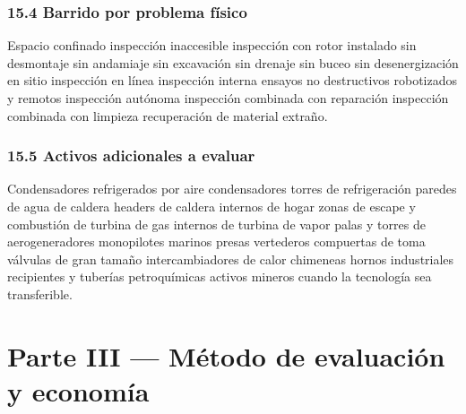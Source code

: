 \documentclass[11pt,a4paper]{article}
\begin{document}
\subsubsection*{15.4 Barrido por problema físico}

Espacio confinado \textperiodcentered{} inspección inaccesible \textperiodcentered{} inspección con rotor instalado \textperiodcentered{} sin desmontaje \textperiodcentered{} sin andamiaje \textperiodcentered{} sin excavación \textperiodcentered{} sin drenaje \textperiodcentered{} sin buceo \textperiodcentered{} sin desenergización \textperiodcentered{} en sitio \textperiodcentered{} inspección en línea \textperiodcentered{} inspección interna \textperiodcentered{} ensayos no destructivos robotizados y remotos \textperiodcentered{} inspección autónoma \textperiodcentered{} inspección combinada con reparación \textperiodcentered{} inspección combinada con limpieza \textperiodcentered{} recuperación de material extraño.


\subsubsection*{15.5 Activos adicionales a evaluar}

Condensadores refrigerados por aire \textperiodcentered{} condensadores \textperiodcentered{} torres de refrigeración \textperiodcentered{} paredes de agua de caldera \textperiodcentered{} headers de caldera \textperiodcentered{} internos de hogar \textperiodcentered{} zonas de escape y combustión de turbina de gas \textperiodcentered{} internos de turbina de vapor \textperiodcentered{} palas y torres de aerogeneradores \textperiodcentered{} monopilotes marinos \textperiodcentered{} presas \textperiodcentered{} vertederos \textperiodcentered{} compuertas de toma \textperiodcentered{} válvulas de gran tamaño \textperiodcentered{} intercambiadores de calor \textperiodcentered{} chimeneas \textperiodcentered{} hornos industriales \textperiodcentered{} recipientes y tuberías petroquímicas \textperiodcentered{} activos mineros cuando la tecnología sea transferible.

\clearpage

\section*{Parte III — Método de evaluación y economía}
\end{document}
